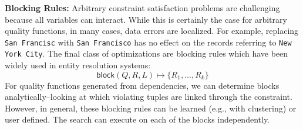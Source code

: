 \vspace{0.5em}\noindent\textbf{Blocking Rules: }  Arbitrary constraint satisfaction problems are challenging because all variables can interact. While this is certainly the case for arbitrary quality functions, in many cases, data errors are localized. For example, replacing \texttt{San Francisc} with \texttt{San Francisco} has no effect on the records referring to \texttt{New York City}. The final class of optimizations are blocking rules which have been widely used in entity resolution systems:
\[\textsf{block}(Q, R, L) \mapsto \{R_1,...,R_k\} \]
For quality functions generated from dependencies, we can determine blocks analytically--looking at which violating tuples are linked through the constraint.
However, in general, these blocking rules can be learned (e.g., with clustering) or user defined.
The search can execute on each of the blocks independently.
\fi
